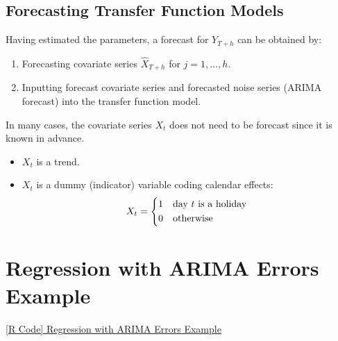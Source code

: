 \subsection*{Forecasting Transfer Function Models}
Having estimated the parameters, a forecast for $ Y_{T+h} $ can be obtained by:
\begin{enumerate}[(1)]
    \item Forecasting covariate series $ \hat{X}_{T+h} $ for $ j=1,\ldots,h $.
    \item Inputting forecast covariate series and forecasted noise series (ARIMA forecast)
          into the transfer function model.
\end{enumerate}
\begin{Remark}{}{}
    In many cases, the covariate series $ X_t $ does not need to be forecast since it is known in advance.
    \begin{Example}{}{}
        \begin{itemize}
            \item $ X_t $ is a trend.
            \item $ X_t $ is a dummy (indicator) variable coding calendar effects:
                  \[ X_t=\begin{cases*}
                          1 & day $ t $ is a holiday \\
                          0 & otherwise
                      \end{cases*} \]

        \end{itemize}
    \end{Example}
\end{Remark}

\section{Regression with ARIMA Errors Example}
\href{https://github.com/Hextical/university-notes/blob/master/year-3/semester-2/STAT 443/code/12.3 - Regression with ARIMA Errors Example.R}{[R Code] Regression with ARIMA Errors Example}

